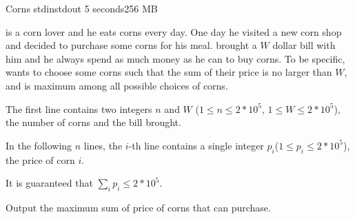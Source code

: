 \begin{problem}{Corns}
{stdin}{stdout}
{5 seconds}{256 MB}{}

\pittoresque is a corn lover and he eats corns every day. One day he visited a new corn shop and decided to purchase some corns for his meal. \pittoresque brought a $W$ dollar bill with him and he always spend as much money as he can to buy corns. To be specific, \pittoresque wants to choose some corns such that the sum of their price is no larger than $W$, and is maximum among all possible choices of corns.


\InputFile

The first line contains two integers $n$ and $W$ ($1 \le n \le 2 * 10^5$, $1 \le W \le 2 * 10^5$), the number of corns and the bill \pittoresque brought.

In the following $n$ lines, the $i$-th line contains a single integer $p_i$($1 \le p_i \le 2 * 10^5$), the price of corn $i$.

It is guaranteed that $\sum_i p_i \leq 2 * 10^5$.

\OutputFile

Output the maximum sum of price of corns that \pittoresque can purchase.

\Examples

\begin{example}
%
\end{example}

\begin{example}
%
\end{example}



\end{problem}
